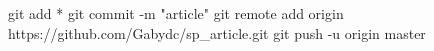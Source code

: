 git add *
git commit -m "article"
git remote add origin https://github.com/Gabydc/sp_article.git
git push -u origin master
